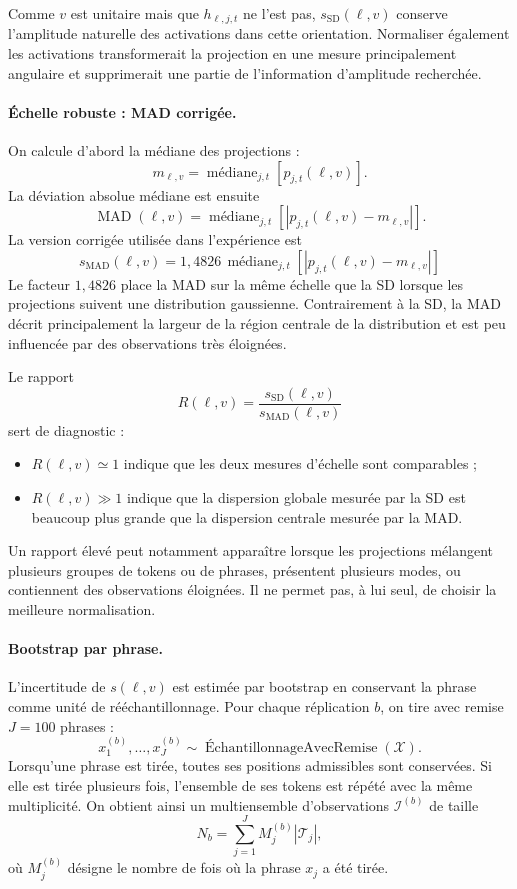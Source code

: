 \documentclass[a4paper,10pt]{article}
\begin{document}
Comme $v$ est unitaire mais que $h_{\ell,j,t}$ ne l'est pas,
$s_{\mathrm{SD}}(\ell,v)$ conserve l'amplitude naturelle des activations dans
cette orientation. Normaliser également les activations transformerait la
projection en une mesure principalement angulaire et supprimerait une partie
de l'information d'amplitude recherchée.

\paragraph{Échelle robuste : MAD corrigée.}

On calcule d'abord la médiane des projections :
\[
m_{\ell,v}
=
\operatorname{médiane}_{j,t}
\left[p_{j,t}(\ell,v)\right].
\]
La déviation absolue médiane est ensuite
\[
\operatorname{MAD}(\ell,v)
=
\operatorname{médiane}_{j,t}
\left[
\left|
p_{j,t}(\ell,v)-m_{\ell,v}
\right|
\right].
\]
La version corrigée utilisée dans l'expérience est
\[
\boxed{
s_{\mathrm{MAD}}(\ell,v)
=
1{,}4826\,
\operatorname{médiane}_{j,t}
\left[
\left|
p_{j,t}(\ell,v)-m_{\ell,v}
\right|
\right]
}
\]
Le facteur $1{,}4826$ place la MAD sur la même échelle que la SD lorsque les
projections suivent une distribution gaussienne. Contrairement à la SD, la MAD
décrit principalement la largeur de la région centrale de la distribution et
est peu influencée par des observations très éloignées.

Le rapport
\[
R(\ell,v)
=
\frac{s_{\mathrm{SD}}(\ell,v)}
     {s_{\mathrm{MAD}}(\ell,v)}
\]
sert de diagnostic :

\begin{itemize}
  \item $R(\ell,v)\simeq 1$ indique que les deux mesures d'échelle sont
        comparables ;
  \item $R(\ell,v)\gg 1$ indique que la dispersion globale mesurée par la SD
        est beaucoup plus grande que la dispersion centrale mesurée par la MAD.
\end{itemize}

Un rapport élevé peut notamment apparaître lorsque les projections mélangent
plusieurs groupes de tokens ou de phrases, présentent plusieurs modes, ou
contiennent des observations éloignées. Il ne permet pas, à lui seul, de choisir
la meilleure normalisation.

\paragraph{Bootstrap par phrase.}

L'incertitude de $s(\ell,v)$ est estimée par bootstrap en conservant la phrase
comme unité de rééchantillonnage. Pour chaque réplication $b$, on tire avec
remise $J=100$ phrases :
\[
x^{(b)}_1,\ldots,x^{(b)}_J
\sim
\operatorname{ÉchantillonnageAvecRemise}(\mathcal{X}).
\]
Lorsqu'une phrase est tirée, toutes ses positions admissibles sont conservées.
Si elle est tirée plusieurs fois, l'ensemble de ses tokens est répété avec la
même multiplicité. On obtient ainsi un multiensemble d'observations
$\mathcal{I}^{(b)}$ de taille
\[
N_b
=
\sum_{j=1}^{J}
M_j^{(b)}|\mathcal{T}_j|,
\]
où $M_j^{(b)}$ désigne le nombre de fois où la phrase $x_j$ a été tirée.
\end{document}
